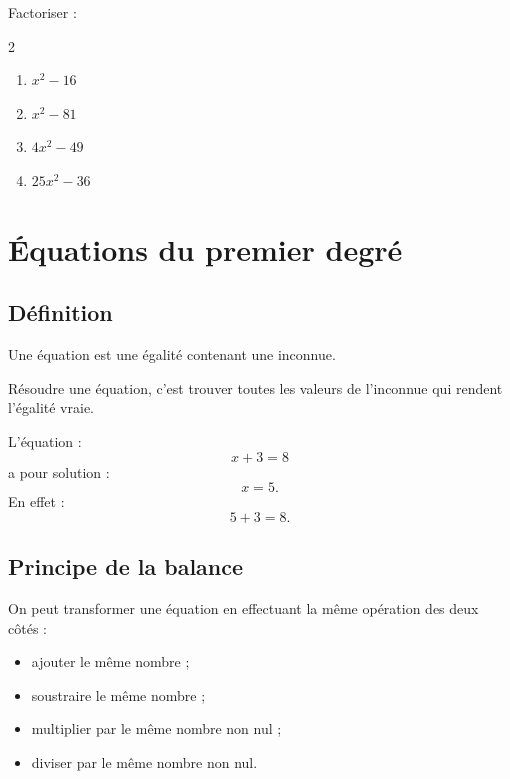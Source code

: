\documentclass[11pt,a4paper]{article}
\newcounter{exercice}
\begin{document}
\begin{exercice}[Méthode]
Factoriser :
\begin{multicols}{2}
\begin{enumerate}[label=\alph*)]
  \item $x^2-16$
  \item $x^2-81$
  \item $4x^2-49$
  \item $25x^2-36$
\end{enumerate}
\end{multicols}
\end{exercice}

\newpage

\section{Équations du premier degré}

\subsection{Définition}

\begin{definitionbox}
Une équation est une égalité contenant une inconnue.

Résoudre une équation, c'est trouver toutes les valeurs de l'inconnue qui rendent l'égalité vraie.
\end{definitionbox}

\begin{exemple}
L'équation :
\[
x+3=8
\]
a pour solution :
\[
x=5.
\]
En effet :
\[
5+3=8.
\]
\end{exemple}

\subsection{Principe de la balance}

\begin{propriete}
On peut transformer une équation en effectuant la même opération des deux côtés :
\begin{itemize}
  \item ajouter le même nombre ;
  \item soustraire le même nombre ;
  \item multiplier par le même nombre non nul ;
  \item diviser par le même nombre non nul.
\end{itemize}
\end{propriete}
\end{document}
